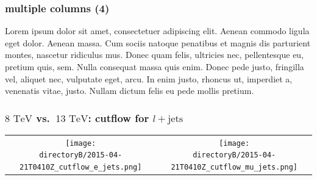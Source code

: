 \begin{frame}
\frametitle{multiple columns (4)}
\setlength\columnsep{30pt}
\begin{multicols}{4}
\justifying
Lorem ipsum dolor sit amet, consectetuer adipiscing elit. Aenean commodo ligula eget dolor. Aenean massa. Cum sociis natoque penatibus et magnis dis parturient montes, nascetur ridiculus mus. Donec quam felis, ultricies nec, pellentesque eu, pretium quis, sem. Nulla consequat massa quis enim. Donec pede justo, fringilla vel, aliquet nec, vulputate eget, arcu. In enim justo, rhoncus ut, imperdiet a, venenatis vitae, justo. Nullam dictum felis eu pede mollis pretium.
\end{multicols}
\end{frame}


%
%

\begin{frame}
\frametitle{${8\textrm{ TeV}}$ vs.~${13\textrm{ TeV}}$: cutflow for ${l+\textrm{jets}}$}
\begin{center}
\begin{tabular}{cc}
\texttt{[image: \\directoryB/2015-04-21T0410Z\_cutflow\_e\_jets.png]}&\texttt{[image: \\directoryB/2015-04-21T0410Z\_cutflow\_mu\_jets.png]}\\
\end{tabular}
\end{center}
\end{frame}

